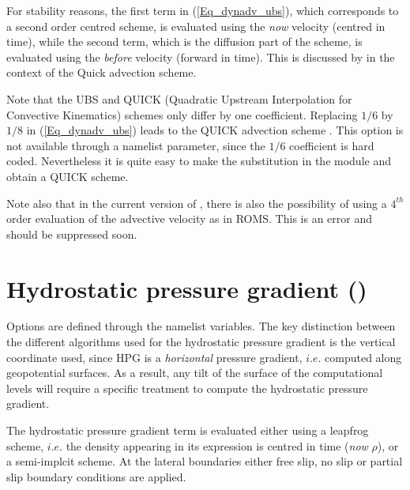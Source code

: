 For stability reasons,  the first term in (\ref{Eq_dynadv_ubs}), which corresponds 
to a second order centred scheme, is evaluated using the \textit{now} velocity 
(centred in time), while the second term, which is the diffusion part of the scheme, 
is evaluated using the \textit{before} velocity (forward in time). This is discussed 
by \citet{Webb_al_JAOT98} in the context of the Quick advection scheme.

Note that the UBS and QUICK (Quadratic Upstream Interpolation for Convective Kinematics) 
schemes only differ by one coefficient. Replacing $1/6$ by $1/8$ in 
(\ref{Eq_dynadv_ubs}) leads to the QUICK advection scheme \citep{Webb_al_JAOT98}. 
This option is not available through a namelist parameter, since the $1/6$ coefficient 
is hard coded. Nevertheless it is quite easy to make the substitution in the
 module and obtain a QUICK scheme.

Note also that in the current version of , there is also the 
possibility of using a $4^{th}$ order evaluation of the advective velocity as in 
ROMS. This is an error and should be suppressed soon.

\section  [Hydrostatic pressure gradient (\textit{dynhpg})]
		{Hydrostatic pressure gradient ()}
\label{DYN_hpg}

Options are defined through the  namelist variables.
The key distinction between the different algorithms used for the hydrostatic 
pressure gradient is the vertical coordinate used, since HPG is a \emph{horizontal} 
pressure gradient, $i.e.$ computed along geopotential surfaces. As a result, any 
tilt of the surface of the computational levels will require a specific treatment to 
compute the hydrostatic pressure gradient.

The hydrostatic pressure gradient term is evaluated either using a leapfrog scheme, 
$i.e.$ the density appearing in its expression is centred in time (\emph{now} $\rho$), or 
a semi-implcit scheme. At the lateral boundaries either free slip, no slip or partial slip 
boundary conditions are applied.

